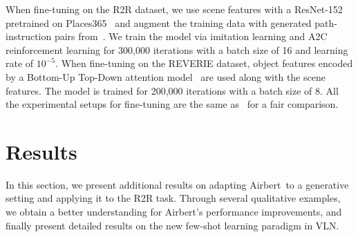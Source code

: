 \RequirePackage[dvipsnames,table]{xcolor} \documentclass[10pt,twocolumn,letterpaper]{article}
\newcommand{\airbert}{Airbert}
\begin{document}
When fine-tuning on the R2R dataset, we use scene features with a ResNet-152 pretrained on Places365~\cite{zhou2017places} and augment the training data with generated path-instruction pairs from~\cite{hao2020prevalent}.
We train the model via imitation learning and A2C reinforcement learning for 300,000 iterations with a batch size of 16 and learning rate of $10^{-5}$.
When fine-tuning on the REVERIE dataset, object features encoded by a Bottom-Up Top-Down attention model~\cite{anderson2017butd} are used along with the scene features.
The model is trained for 200,000 iterations with a batch size of 8.
All the experimental setups for fine-tuning are the same as~\cite{hong2021recurrentvln} for a fair comparison.


\section{Results}
\label{sec:supp-results}

In this section, we present additional results on adapting \airbert~to a generative setting and applying it to the R2R task.
Through several qualitative examples, we obtain a better understanding for \airbert's performance improvements, and finally present detailed results on the new few-shot learning paradigm in VLN.
\end{document}
